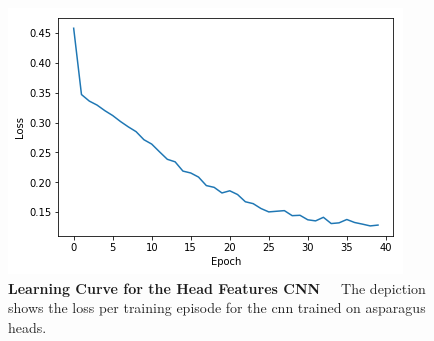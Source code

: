\begin{table}[!hb]
	\centering
	\caption[Head Features CNN Performance]{\textbf{Performance of Head Features CNN}~~~Performance of the \acrshort{cnn} trained on asparagus heads.}
	\label{tab:performance_measures_head_based}
\end{table}

\begin{figure}[!htb]
	\centering
	\includegraphics[scale=1.8]{Figures/chapter04/head_curve.png}
	\decoRule
	\caption[Head Features CNN Learning Curve]{\textbf{Learning Curve for the Head Features CNN}~~~The depiction shows the loss per training episode for the \acrshort{cnn} trained on asparagus heads.}
	\label{fig:HeadCurve}
\end{figure}	

